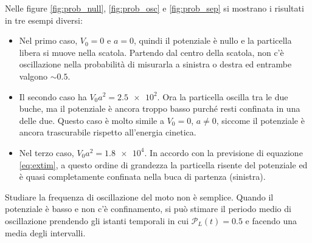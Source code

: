 \documentclass[a4paper, titlepage]{article}
\numberwithin{equation}{section}
\begin{document}
Nelle figure \ref{fig:prob_null}, \ref{fig:prob_osc} e \ref{fig:prob_sep} si mostrano i risultati in tre esempi diversi:
\begin{itemize}
    \item Nel primo caso, $V_0 = 0$ e $a = 0$, quindi il potenziale è nullo e la particella libera si muove nella scatola. Partendo dal centro della scatola, non c'è oscillazione nella probabilità di misurarla a sinistra o destra ed entrambe valgono $\sim 0.5$.
    \item Il secondo caso ha $V_0 a^2 = \num{2.5e2}$. Ora la particella oscilla tra le due buche, ma il potenziale è ancora troppo basso purché resti confinata in una delle due. Questo caso è molto simile a $V_0 = 0$, $a \neq 0$, siccome il potenziale è ancora trascurabile rispetto all'energia cinetica.
    \item Nel terzo caso, $V_0 a^2 = \num{1.8e4}$. In accordo con la previsione di equazione \eqref{eq:extim}, a questo ordine di grandezza la particella risente del potenziale ed è quasi completamente confinata nella buca di partenza (sinistra).
\end{itemize}
Studiare la frequenza di oscillazione del moto non è semplice. Quando il potenziale è basso e non c'è confinamento, si può stimare il periodo medio di oscillazione prendendo gli istanti temporali in cui $\mathcal{P}_L(t) = 0.5$ e facendo una media degli intervalli.








\appendix
\end{document}
